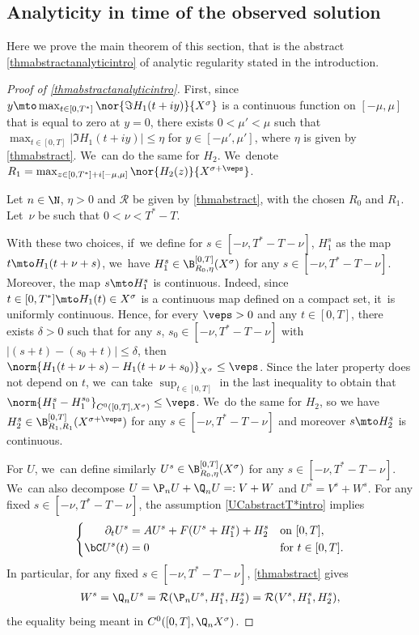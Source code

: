 \subsection{Analyticity in time of the observed solution} Here we prove the main theorem of this section, that is the abstract \cref{thmabstractanalyticintro} of analytic regularity stated in the introduction.
\begin{proof}[Proof of \cref{thmabstractanalyticintro}]
First, since $y\mto \max_{t\in [0,T^{*}]}\nor{\Im H_{1}(t+iy)}{X^{\sigma}}$ is a continuous function on $[-\mu,\mu]$ that is equal to zero at $y=0$, there exists $0<\mu'<\mu$ such that $\max_{t\in [0,T]}\left|\Im H_{1}(t+iy)\right| \leq \eta$ for $y\in [-\mu',\mu']$, where $\eta$ is given by \cref{thmabstract}. We~can do the same for $H_{2}$. We~denote $R_{1}=\max_{z\in [0,T^{*}]+i[-\mu,\mu]}\nor{H_{2}(z)}{X^{\sigma+\veps}}$.

Let $n\in \N$, $\eta>0$ and $\mathcal{R}$ be given by \cref{thmabstract}, with the chosen $R_0$ and $R_{1}$. Let~$\nu$ be such that $0<\nu<T^*-T$.

With these two choices, if~we define for $s\in [-\nu, T^*-T-\nu]$, $H_{1}^{s}$ as the map $t\mto H_{1}(t+\nu+s)$, we~have $H_{1}^{s} \in \B_{R_{0},\eta}^{[0,T]}(X^{\sigma})$ for any $s\in [-\nu, T^*-T-\nu]$. Moreover, the map $s\mto H_1^s$ is continuous. Indeed, since $t\in [0, T^*]\mto H_1(t)\in X^\sigma$ is a continuous map defined on a compact set, it~is uniformly continuous. Hence, for every $\veps>0$ and any $t\in [0, T]$, there exists $\delta>0$ such that for any $s$, $s_0\in [-\nu, T^*-T-\nu]$ with $|(s+t)-(s_0+t)|\leq \delta$, then $\norm{H_1(t+\nu+s)-H_1(t+\nu+s_0)}_{X^\sigma}\leq \veps$. Since the later property does not depend on $t$, we~can take $\sup_{t\in [0, T]}$ in the last inequality to obtain that $\norm{H_1^s-H_1^{s_0}}_{C^0([0, T], X^\sigma)}\leq \veps$. We~do the same for $H_2$, so we have $H_2^s\in \B_{R_{1},R_{1}}^{[0,T]}(X^{\sigma+\veps})$ for any $s\in [-\nu, T^*-T-\nu]$ and moreover $s\mto H_2^s$ is continuous.

For $U$, we~can define similarly $U^s\in \B_{R_{0},\eta}^{[0,T]}(X^{\sigma})$ for any $s\in [-\nu, T^*-T-\nu]$. We~can also decompose $U=\P_n U+\Q_n U=:V+W$ and $U^s=V^s+W^s$. For any fixed $s\in [-\nu, T^*-T-\nu]$, the assumption \eqref{UCabstractT*intro} implies
\begin{align}\label{UCabstractwiths}
\left\{\begin{aligned}
\partial_t U^s&=AU^s+F(U^s+H_{1}^s)+H_{2}^s&& \textnormal{on } [0,T],\\
\bC U^s(t)&=0 &&\textnormal{for }t\in [0,T].
\end{aligned}\right.
\end{align}
In particular, for any fixed $s\in [-\nu, T^*-T-\nu]$, \cref{thmabstract} gives
\begin{align}
\label{equalWs}
W^s=\Q_n U^s=\mathcal{R}(\P_{n}U^s,H_{1}^s,H_{2}^s)=\mathcal{R}(V^s,H_{1}^s,H_{2}^s),
\end{align} the equality being meant in $C^0([0,T], \Q_n X^{\sigma})$.


\end{proof}
